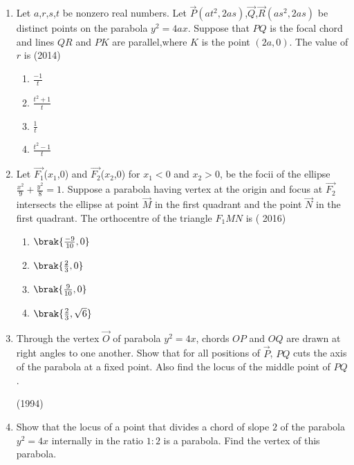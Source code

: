 \begin{enumerate}
\begin{multicols}{4}
\begin{enumerate}
    \item $\frac{-2}{3}\sqrt{5}$
\end{enumerate}
\end{multicols}
\item Let $a$,$r$,$s$,$t$ be nonzero real numbers. Let $\Vec{P}$$(at^2,2as)$,$\Vec{Q}$,$\Vec{R}$$(as^2,2as)$ be distinct points on the parabola $y^2=4ax$. Suppose that $PQ$ is the focal chord and lines $QR$ and $PK$ are parallel,where $K$ is the point $(2a,0)$.
 The value of $r$ is 
\hfill(2014)
\begin{multicols}{4}
\begin{enumerate}
    \item $\frac{-1}{t}$ 
    \item $\frac{t^2+1}{t}$
    \item $\frac{1}{t}$
    \item $\frac{t^2-1}{t}$
\end{enumerate}
\end{multicols}
\item Let $\vec{F_1}$($x_1$,0) and  $\vec{F_2}$($x_2$,0) for $x_1<0$ and $x_2>0$, be the focii of the ellipse $\frac{x^2}{9}+\frac{y^2}{8} =1$. Suppose a parabola having vertex at the origin and focus at $\vec{F_2}$ intersects the ellipse at point $\Vec{M}$ in the first quadrant and the point $\Vec{N}$ in the first quadrant.
The orthocentre of the triangle $F_1MN$ is
         \hfill( 2016)
\begin{multicols}{4}
\begin{enumerate}
	\item $\brak{\frac{-9}{10},0}$   
	\item $\brak{\frac{2}{3},0}$     
	\item $\brak{\frac{9}{10},0}$ 
     \item $\brak{\frac{2}{3},\sqrt{6}}$ 
    \end{enumerate}
\end{multicols}
		
      \item Through the vertex $\vec{O}$ of parabola $y^2=4x$, chords $OP$ and $OQ$ are drawn at right angles to one another. Show that for all positions of $\vec{P}$, $PQ$ cuts the axis of the parabola at a fixed point. Also find the locus of the middle point of $PQ$. 

		\hfill(1994)
		
      \item Show that the locus of a point that divides a chord of slope $2$ of the parabola $y^2=4x$ internally in the ratio $1:2$ is a parabola. Find the vertex of this parabola. 


\end{enumerate}
